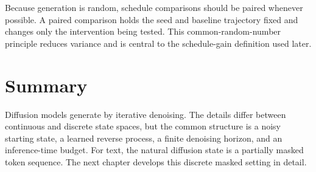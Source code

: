 Because generation is random, schedule comparisons should be paired whenever
possible. A paired comparison holds the seed and baseline trajectory fixed and
changes only the intervention being tested. This common-random-number
principle reduces variance and is central to the schedule-gain definition used
later.

\section{Summary}
\label{sec:ch2-summary}

Diffusion models generate by iterative denoising. The details differ between
continuous and discrete state spaces, but the common structure is a noisy
starting state, a learned reverse process, a finite denoising horizon, and an
inference-time budget. For text, the natural diffusion state is a partially
masked token sequence. The next chapter develops this discrete masked setting
in detail.
